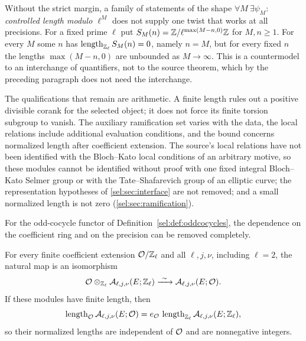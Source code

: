\begin{remark}\label{sel:rem:countermodel}
Without the strict margin, a family of statements of the shape
$\forall M\ \exists\psi_M$: \emph{controlled length modulo $\ell^M$} does
not supply one twist that works at all precisions. For a fixed prime $\ell$
put $S_M(n)=\mathbb{Z}/\ell^{\max(M-n,0)}\mathbb{Z}$ for $M,n\ge1$. For every $M$ some $n$
has $\operatorname{length}_{\mathbb{Z}_\ell}S_M(n)=0$, namely $n=M$, but for every fixed $n$ the
lengths $\max(M-n,0)$ are unbounded as $M\to\infty$. This is a countermodel
to an interchange of quantifiers, not to the source theorem, which by the
preceding paragraph does not need the interchange.
\end{remark}

The qualifications that remain are arithmetic. A finite length rules out a
positive divisible corank for the selected object; it does not force its
finite torsion subgroup to vanish. The auxiliary ramification set varies
with the data, the local relations include additional evaluation
conditions, and the bound concerns normalized length after coefficient
extension. The source's local relations have not been identified with the
Bloch--Kato local conditions of an arbitrary motive, so these modules cannot
be identified without proof with one fixed integral Bloch--Kato Selmer
group or with the Tate--Shafarevich group of an elliptic curve; the
representation hypotheses of \cref{sel:sec:interface} are not removed; and
a small normalized length is not zero (\cref{sel:sec:ramification}).

For the odd-cocycle functor of Definition~\ref{sel:def:oddcocycles}, the dependence
on the coefficient ring and on the precision can be removed completely.

\begin{theorem}\label{sel:thm:basechange}
For every finite coefficient extension $\mathcal{O}/\mathbb{Z}_\ell$ and all
$\ell,j,\nu$, including $\ell=2$, the natural map is an isomorphism
\[
 \mathcal{O}\otimes_{\mathbb{Z}_\ell}\mathcal{A}_{\ell,j,\nu}(E;\mathbb{Z}_\ell)
 \xrightarrow{\ \sim\ }\mathcal{A}_{\ell,j,\nu}(E;\mathcal{O}).
\]
If these modules have finite length, then
\[
 \operatorname{length}_{\mathcal{O}}\mathcal{A}_{\ell,j,\nu}(E;\mathcal{O})
 =e_{\mathcal{O}}\,\operatorname{length}_{\mathbb{Z}_\ell}\mathcal{A}_{\ell,j,\nu}(E;\mathbb{Z}_\ell),
\]
so their normalized lengths are independent of $\mathcal{O}$ and are nonnegative
integers.
\end{theorem}

